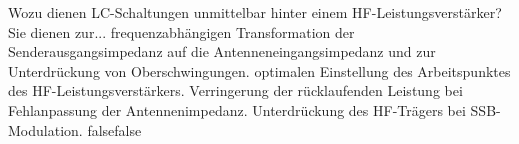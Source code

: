     {Wozu dienen LC-Schaltungen unmittelbar hinter einem HF-Leistungsverstärker? Sie dienen zur...}
    {frequenzabhängigen Transformation der Senderausgangsimpedanz auf die Antenneneingangsimpedanz und zur Unterdrückung von Oberschwingungen.}
    {optimalen Einstellung des Arbeitspunktes des HF-Leistungsverstärkers.}
    {Verringerung der rücklaufenden Leistung bei Fehlanpassung der Antennenimpedanz.}
    {Unterdrückung des HF-Trägers bei SSB-Modulation. }
    {false}{false}